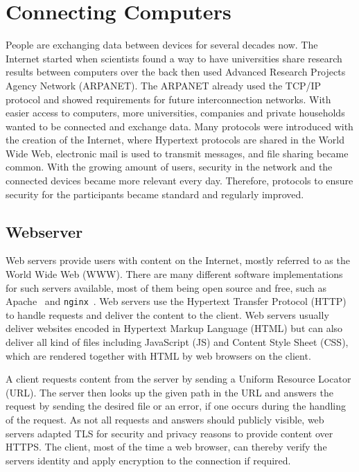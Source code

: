 \section{Connecting Computers}

People are exchanging data between devices for several decades now. The Internet
started when scientists found a way to have universities share research results
between computers over the back then used Advanced Research Projects Agency
Network (ARPANET).  The ARPANET already used the TCP/IP protocol and showed
requirements for future interconnection networks. With easier access to
computers, more universities, companies and private households wanted to be
connected and exchange data. Many protocols were introduced with the creation of
the Internet, where Hypertext protocols are shared in the World Wide Web,
electronic mail is used to transmit messages, and file sharing became common.
With the growing amount of users, security in the network and the connected
devices became more relevant every day. Therefore, protocols to ensure security
for the participants became standard and regularly improved.

\subsection{Webserver}

Web servers provide users with content on the Internet, mostly referred to as
the World Wide Web (WWW). There are many different software implementations for
such servers available, most of them being open source and free, such as
Apache~\cite{apacheweb} and \texttt{nginx}~\cite{nginxweb}. Web servers use the
Hypertext Transfer Protocol (HTTP) to handle requests and deliver the content to
the client. Web servers usually deliver websites encoded in Hypertext Markup
Language (HTML) but can also deliver all kind of files including JavaScript (JS)
and Content Style Sheet (CSS), which are rendered together with HTML by web
browsers on the client.

A client requests content from the server by sending a Uniform Resource Locator
(URL). The server then looks up the given path in the URL and answers the
request by sending the desired file or an error, if one occurs during the
handling of the request. As not all requests and answers should publicly
visible, web servers adapted TLS for security and privacy reasons to provide
content over HTTPS. The client, most of the time a web browser, can thereby
verify the server\textquotesingle s identity and apply encryption to the
connection if required.

